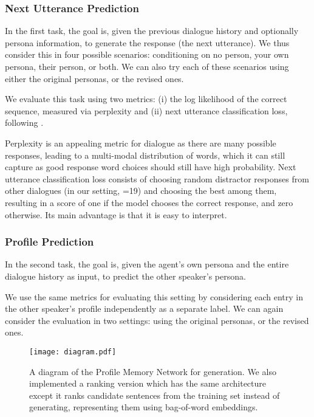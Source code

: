 \documentclass[11pt,a4paper]{article}
\begin{document}
\subsubsection{Next Utterance Prediction}

In the first task, the goal is, given the previous dialogue history and optionally persona information, to generate the response (the next utterance). We thus consider this in four possible scenarios: conditioning on no person, your own persona, their person, or both. We can also try each of these scenarios using either the original personas, or the revised ones.

We evaluate this task using two metrics: (i) the log likelihood of the correct sequence, measured via perplexity and (ii) 
next utterance classification loss, following \cite{lowe2015ubuntu}.

Perplexity is an appealing metric for dialogue as there are many possible responses, leading to a multi-modal distribution of words, which it can still capture as good response word choices should still have high probability. Next utterance classification loss consists of choosing  random distractor responses from other dialogues (in our setting, =19) and choosing the best among them, resulting in a score of one if the model chooses the correct response, and zero otherwise. Its main advantage is that it is easy to interpret.

\subsubsection{Profile Prediction}

In the second task, the goal is, given the agent's own persona and the entire dialogue history as input, to predict the other speaker's persona.

We use the same metrics for evaluating this setting by considering each entry in the other speaker's profile independently as a separate label. We can again consider the evaluation in two settings: using the original personas, or the revised ones. 
\fi
 \ifarxiv
\begin{figure*}[t]
	\centering
	\texttt{[image: diagram.pdf]}
    \caption{\label{fig:PMN-gen}A diagram of the Profile Memory Network for generation. We also implemented a ranking version which has the same architecture except it ranks candidate sentences from the training set instead of generating, representing them using bag-of-word embeddings.}
\end{figure*}
\fi
\end{document}

